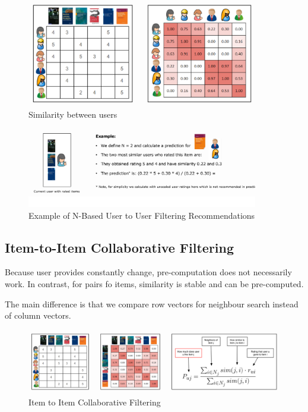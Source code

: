 \documentclass[11pt]{article}
\begin{document}
\begin{figure}[htb!]
    \centering
    \includegraphics[keepaspectratio=true, width=0.9\textwidth]{user_to_user_collaborative_filtering_v2.png}
    \caption{Similarity between users}
    \label{fig:user_similarity}
\end{figure}

\newpage

\begin{figure}[htb!]
    \centering
    \includegraphics[keepaspectratio=true, width=0.9\textwidth]{user_to_user_collaborative_filtering_v3.png}
    \caption{Example of N-Based User to User Filtering Recommendations}
    \label{fig:user_to_user_recommendation}
\end{figure}


\subsection{Item-to-Item Collaborative Filtering}

Because user provides constantly change, pre-computation does not necessarily work. In contrast, for pairs fo items, similarity is stable and can be pre-computed.

The main difference is that we compare row vectors for neighbour search instead of column vectors.

\begin{figure}[htb!]
    \centering
    \includegraphics[keepaspectratio=true, width=\linewidth]{item_to_item_collaborative_filtering.png}
    \caption{Item to Item Collaborative Filtering}
    \label{fig:item_to_item_collaborative_filtering}
\end{figure}
\end{document}
